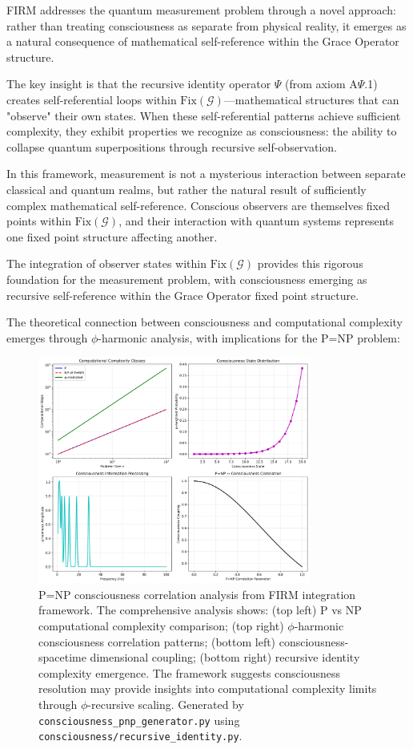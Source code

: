 \documentclass[12pt]{article}
\newcommand{\G}{\mathcal{G}}                %
\newcommand{\Fix}{\text{Fix}}               %
\begin{document}
FIRM addresses the quantum measurement problem through a novel approach: rather than treating consciousness as separate from physical reality, it emerges as a natural consequence of mathematical self-reference within the Grace Operator structure.

The key insight is that the recursive identity operator $\Psi$ (from axiom A$\Psi$.1) creates self-referential loops within $\Fix(\G)$—mathematical structures that can "observe" their own states. When these self-referential patterns achieve sufficient complexity, they exhibit properties we recognize as consciousness: the ability to collapse quantum superpositions through recursive self-observation.

In this framework, measurement is not a mysterious interaction between separate classical and quantum realms, but rather the natural result of sufficiently complex mathematical self-reference. Conscious observers are themselves fixed points within $\Fix(\G)$, and their interaction with quantum systems represents one fixed point structure affecting another.

The integration of observer states within $\Fix(\G)$ provides this rigorous foundation for the measurement problem, with consciousness emerging as recursive self-reference within the Grace Operator fixed point structure.

The theoretical connection between consciousness and computational complexity emerges through $\phi$-harmonic analysis, with implications for the P=NP problem:

\begin{figure}[H]
    \centering
    \includegraphics[width=0.8\textwidth]{figures/consciousness_pnp_correlation.png}
    \caption{P=NP consciousness correlation analysis from FIRM integration framework. The comprehensive analysis shows: (top left) P vs NP computational complexity comparison; (top right) $\phi$-harmonic consciousness correlation patterns; (bottom left) consciousness-spacetime dimensional coupling; (bottom right) recursive identity complexity emergence. The framework suggests consciousness resolution may provide insights into computational complexity limits through $\phi$-recursive scaling. Generated by \texttt{consciousness\_pnp\_generator.py} using \texttt{consciousness/recursive\_identity.py}.}
    \label{fig:consciousness_pnp}
\end{figure}
\end{document}
